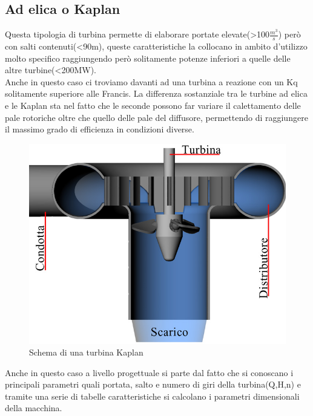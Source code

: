 \subsection{Ad elica o Kaplan}
Questa tipologia di turbina permette di elaborare portate elevate(>100{\large$\frac{m^3}{s}$}) però con salti contenuti(<90m), queste caratteristiche la collocano in ambito d'utilizzo molto specifico raggiungendo però solitamente potenze inferiori a quelle delle altre turbine(<200MW).\\
Anche in questo caso ci troviamo davanti ad una turbina a reazione con un Kq solitamente superiore alle Francis.
La differenza sostanziale tra le turbine ad elica e le Kaplan sta nel fatto che le seconde possono far variare il calettamento delle pale rotoriche oltre che quello delle pale del diffusore, permettendo di raggiungere il massimo grado di efficienza in condizioni diverse.
\begin{figure}[H]
    \centering
    \includegraphics[height=0.4\textwidth]{res/cap 3/kaplan}
    \caption{Schema di una turbina Kaplan}
\end{figure}\noindent
Anche in questo caso a livello progettuale si parte dal fatto che si conoscano i principali parametri quali portata, salto e numero di giri della turbina(Q,H,n) e tramite una serie di tabelle caratteristiche si calcolano i parametri dimensionali della macchina.